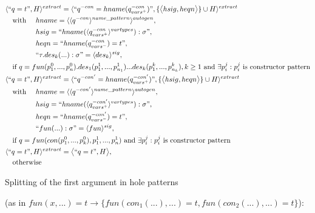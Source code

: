 \documentclass[11pt]{article} %
\begin{document}
\begin{alignat*}{3}
&\langle `` q = t ", H \rangle^{extract} = \langle `` q^{-con} = hname (q^{-con}_{vars^+}) ", \{\big\langle hsig, heqn \big\rangle\} \cup H \rangle^{extract} \span\span \\
&\quad \textrm{with } && hname = \langle \langle q^{-con} \rangle^{name\_pattern} \rangle^{autogen}, \\
&\quad && hsig = `` hname(\langle q^{-con}_{vars^+} \rangle^{vartypes}): \sigma ", \\
&\quad && heqn = `` hname(q^{-con}_{vars^-}) = t ", \\
&\quad && `` \tau.des_k(...): \sigma " = \langle des_k \rangle^{sig}, \\
&\quad \textrm{if } q = fun(p_1^0, ..., p_n^0).des_1(p_1^1, ..., p_{n_1}^1)...des_k(p_1^k, ..., p_{n_k}^k), k \geq 1 \textrm{ and } \exists p_i^j: p_i^j \textrm{ is constructor pattern} \span\span \\
&\langle `` q = t ", H \rangle^{extract} = \langle `` q^{-con'} = hname (q^{-con'}_{vars^+}) ", \{\big\langle hsig, heqn \big\rangle\} \cup H \rangle^{extract} \span\span \\
&\quad \textrm{with } && hname = \langle \langle q^{-con'} \rangle^{name\_pattern} \rangle^{autogen}, \\
&\quad && hsig = `` hname(\langle q^{-con'}_{vars^+} \rangle^{vartypes}): \sigma ", \\
&\quad && heqn = `` hname(q^{-con'}_{vars^-}) = t ", \\
&\quad && `` fun(...): \sigma " = \langle fun \rangle^{sig}, \\
&\quad \textrm{if } q = fun(con(p_1^0, ..., p_k^0), p^1_1, ..., p^1_n) \textrm{ and } \exists p_i^j: p_i^j \textrm{ is constructor pattern} \span\span \\
&\langle `` q = t ", H \rangle^{extract} = \big\langle `` q = t ", H \big\rangle, \span\span \\
&\quad \textrm{otherwise} \span\span
\end{alignat*}

Splitting of the first argument in hole patterns

(as in $fun(x,...) = t \rightarrow \{fun(con_1(...),...) = t, fun(con_2(...),...) = t\}$):
\end{document}

